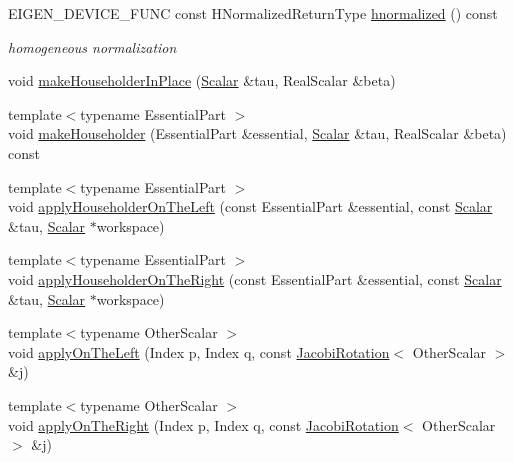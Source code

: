 \begin{DoxyCompactItemize}
\item 
E\+I\+G\+E\+N\+\_\+\+D\+E\+V\+I\+C\+E\+\_\+\+F\+U\+NC const H\+Normalized\+Return\+Type \mbox{\hyperlink{group___geometry___module_gad7e913733107a9a1b61bff95ec9c03dd}{hnormalized}} () const
\begin{DoxyCompactList}\small\item\em homogeneous normalization \end{DoxyCompactList}\item 
void \mbox{\hyperlink{class_eigen_1_1_matrix_base_aebf4bac7dffe2685ab93734fb776e817}{make\+Householder\+In\+Place}} (\mbox{\hyperlink{class_eigen_1_1_dense_base_a5feed465b3a8e60c47e73ecce83e39a2}{Scalar}} \&tau, Real\+Scalar \&beta)
\item 
{\footnotesize template$<$typename Essential\+Part $>$ }\\void \mbox{\hyperlink{class_eigen_1_1_matrix_base_a13291e900f7e81ddc6e5b8802f82092b}{make\+Householder}} (Essential\+Part \&essential, \mbox{\hyperlink{class_eigen_1_1_dense_base_a5feed465b3a8e60c47e73ecce83e39a2}{Scalar}} \&tau, Real\+Scalar \&beta) const
\item 
{\footnotesize template$<$typename Essential\+Part $>$ }\\void \mbox{\hyperlink{class_eigen_1_1_matrix_base_a8f2c8059ef3f04cfa0c73b4c012db855}{apply\+Householder\+On\+The\+Left}} (const Essential\+Part \&essential, const \mbox{\hyperlink{class_eigen_1_1_dense_base_a5feed465b3a8e60c47e73ecce83e39a2}{Scalar}} \&tau, \mbox{\hyperlink{class_eigen_1_1_dense_base_a5feed465b3a8e60c47e73ecce83e39a2}{Scalar}} $\ast$workspace)
\item 
{\footnotesize template$<$typename Essential\+Part $>$ }\\void \mbox{\hyperlink{class_eigen_1_1_matrix_base_ab3e52262b41fa40e194dda245e0f9675}{apply\+Householder\+On\+The\+Right}} (const Essential\+Part \&essential, const \mbox{\hyperlink{class_eigen_1_1_dense_base_a5feed465b3a8e60c47e73ecce83e39a2}{Scalar}} \&tau, \mbox{\hyperlink{class_eigen_1_1_dense_base_a5feed465b3a8e60c47e73ecce83e39a2}{Scalar}} $\ast$workspace)
\item 
{\footnotesize template$<$typename Other\+Scalar $>$ }\\void \mbox{\hyperlink{class_eigen_1_1_matrix_base_ae669131f6e18f7e8f06fae271754f435}{apply\+On\+The\+Left}} (Index p, Index q, const \mbox{\hyperlink{class_eigen_1_1_jacobi_rotation}{Jacobi\+Rotation}}$<$ Other\+Scalar $>$ \&j)
\item 
{\footnotesize template$<$typename Other\+Scalar $>$ }\\void \mbox{\hyperlink{class_eigen_1_1_matrix_base_aa07f741c86219601664433777827bf1c}{apply\+On\+The\+Right}} (Index p, Index q, const \mbox{\hyperlink{class_eigen_1_1_jacobi_rotation}{Jacobi\+Rotation}}$<$ Other\+Scalar $>$ \&j)

\end{DoxyCompactItemize}
